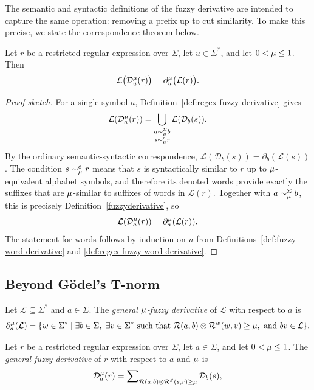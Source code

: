 \noindent
The semantic and syntactic definitions of the fuzzy derivative are intended to
capture the same operation: removing a prefix up to cut similarity. To make this
precise, we state the correspondence theorem below.

\begin{theorem}\label{the:two-fuzzy-derivative-mapping}
Let $r$ be a restricted regular expression over $\Sigma$, let $u\in\Sigma^*$, and let
$0 < \mu \le 1$. Then
\[
  \mathcal{L}\bigl(\mathcal{D}^\mu_u(r)\bigr)
  =
  \partial^\mu_u\bigl(\mathcal{L}(r)\bigr).
\]
\end{theorem}

\begin{proof}[Proof sketch]
For a single symbol $a$, Definition~\ref{def:regex-fuzzy-derivative} gives
\[
  \mathcal L(\mathcal D_a^\mu(r))
  =
  \bigcup_{\substack{a\sim_\mu^\Sigma b\\ s\sim_\mu^e r}}
  \mathcal L(\mathcal D_b(s)).
\]
By the ordinary semantic-syntactic correspondence,
$\mathcal L(\mathcal D_b(s))=\partial_b(\mathcal L(s))$. The condition
$s\sim_\mu^e r$ means that $s$ is syntactically similar to $r$ up to
$\mu$-equivalent alphabet symbols, and therefore its denoted words provide
exactly the suffixes that are $\mu$-similar to suffixes of words in
$\mathcal L(r)$. Together with $a\sim_\mu^\Sigma b$, this is precisely
Definition~\ref{fuzzyderivative}, so
\[
  \mathcal L(\mathcal D_a^\mu(r))
  =
  \partial_a^\mu(\mathcal L(r)).
\]
The statement for words follows by induction on $u$ from
Definitions~\ref{def:fuzzy-word-derivative} and
\ref{def:regex-fuzzy-word-derivative}.
\end{proof}

{\color{red}\subsection{Beyond G\"odel's T-norm}
\begin{definition}\label{fuzzyderivative}
Let $\mathcal{L}\subseteq\Sigma^*$ and $a\in\Sigma$. The \emph{general $\mu$-fuzzy
derivative} of $\mathcal{L}$ with respect to $a$ is
$$
\partial_a^\mu(\mathcal{L})
=
\{w \in \Sigma^* \mid
  \exists b \in \Sigma,\ \exists v\in\Sigma^*
  \text{ such that }
  {\mathcal R}(a,b)\otimes \mathcal{R}^w(w,v)\ge\mu,\ \text{and } bv \in \mathcal{L}
\}.
$$
\end{definition}
\begin{definition}\label{def:regex-fuzzy-derivative}
Let $r$ be a restricted regular expression over $\Sigma$, let $a\in\Sigma$, and let
$0<\mu\le 1$. The \emph{general fuzzy derivative} of $r$ with respect to $a$ and
$\mu$ is
\[
  \mathcal D_a^\mu(r)
  =
  \sum\nolimits_{\mathcal R(a, b)\otimes \mathcal R^{\mathcal E}( s, r)\geq \mu}
  \mathcal D_b(s),
\]
\end{definition}}


